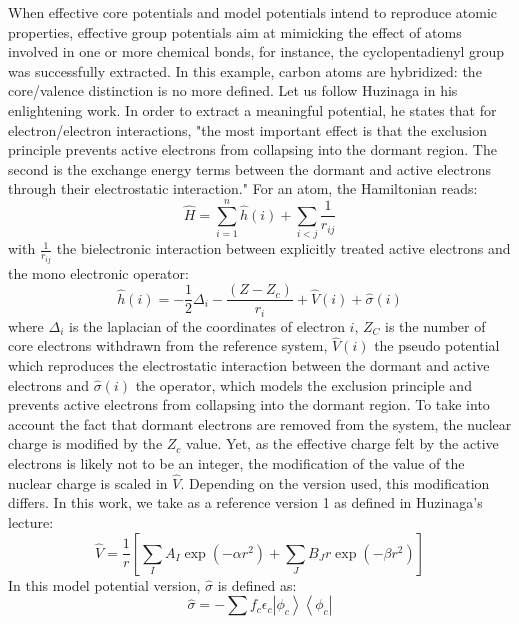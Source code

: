 \documentclass[journal=jctcce,manuscript=article]{achemso}
\begin{document}
When effective core potentials and model potentials intend to reproduce atomic properties,
effective group potentials aim at mimicking the effect of atoms involved in one or more chemical
bonds, for instance, the cyclopentadienyl group was successfully extracted.
In this example, carbon atoms are hybridized: the core/valence distinction is no more defined.
Let us follow Huzinaga in his enlightening work.\cite{huzinaga_effective_1991}
In order to extract a meaningful potential, he states that for electron/electron interactions, 
"the most important effect is that the exclusion principle prevents active electrons
from collapsing into the dormant region.
The second is the exchange energy terms between the dormant and active electrons
through their electrostatic interaction."
For an atom, the Hamiltonian reads:
\begin{equation}
\label{eq:atomicHamiltonian}
\hat{H} = \sum_{i=1}^n \hat{h}(i) +\sum_{i<j}\frac{1}{r_{ij}}
\end{equation}
with $\frac{1}{r_{ij}}$ the bielectronic interaction
between explicitly treated active electrons and
the mono electronic operator:
\begin{equation}
\label{eq:monoElectronicOperator}
\hat{h}(i) = -\frac{1}{2}\Delta_i - \frac{(Z-Z_c)}{r_i}+\hat{V}(i) + \hat{\sigma}(i)
\end{equation}
where
$\Delta_i$ is the laplacian of the coordinates of electron $i$,
$Z_C$ is the number of core electrons withdrawn from the reference system,
$\hat{V}(i)$ the pseudo potential which reproduces the electrostatic
interaction between the dormant and active electrons
and $\hat{\sigma}(i)$ the operator, which models the exclusion principle
and prevents active electrons from collapsing into the dormant region.
To take into account the fact that dormant electrons are removed from the
system, the nuclear charge is modified by the $Z_c$ value.
Yet, as the effective charge felt by the active electrons is likely not to be an integer,
the modification of the value of the nuclear charge is scaled in $\hat{V}$.
Depending on the version used, this modification differs.
In this work, we take as a reference version 1 as defined in
Huzinaga's lecture\cite{huzinaga_1994_1995}:
\begin{equation}
\label{eq:HuzinagaMPVersion1Potential}
\hat{V} = \frac{1}{r}\left[\sum_IA_I\exp(-\alpha r^2)+\sum_JB_Jr\exp(-\beta r^2)\right]
\end{equation}
In this model potential version, $\hat{\sigma}$ is defined as:
\begin{equation}
\label{eq:HuzinagaMPVersion1Sigma}
\hat{\sigma} = -\sum f_c\epsilon_c\left|\phi_c\right>\left<\phi_c\right|
\end{equation}
\end{document}
